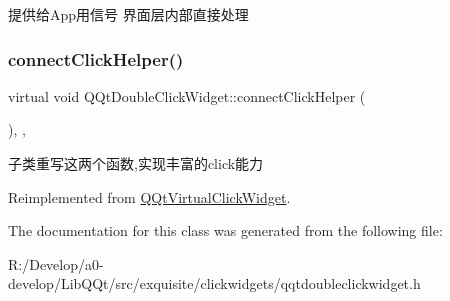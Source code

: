 提供给\+App用信号 界面层内部直接处理 \mbox{\label{class_q_qt_double_click_widget_a5518af71ca2e9a7d7d1230faeb78015d}} 
\subsubsection{\texorpdfstring{connect\+Click\+Helper()}{connectClickHelper()}}
{\footnotesize\ttfamily virtual void Q\+Qt\+Double\+Click\+Widget\+::connect\+Click\+Helper (\begin{DoxyParamCaption}{ }\end{DoxyParamCaption})\hspace{0.3cm}{\ttfamily [inline]}, {\ttfamily [protected]}, {\ttfamily [virtual]}}

子类重写这两个函数,实现丰富的click能力 

Reimplemented from \mbox{\hyperlink{class_q_qt_virtual_click_widget_a2e9874c5ec5aba763426dcacb012d7a7}{Q\+Qt\+Virtual\+Click\+Widget}}.



The documentation for this class was generated from the following file\+:\begin{DoxyCompactItemize}
\item 
R\+:/\+Develop/a0-\/develop/\+Lib\+Q\+Qt/src/exquisite/clickwidgets/qqtdoubleclickwidget.\+h\end{DoxyCompactItemize}
